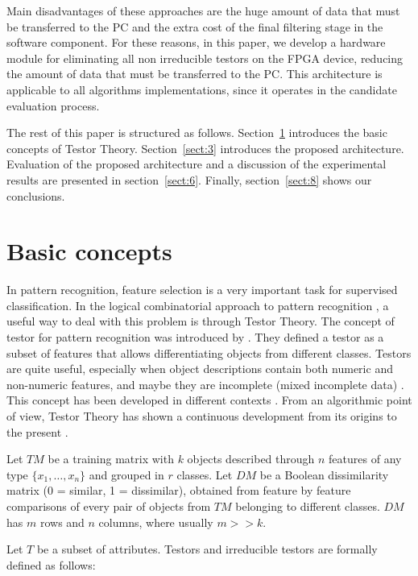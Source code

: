 \documentclass[conference]{IEEEtran}
\begin{document}
Main disadvantages of these approaches are the huge amount of data that must be transferred to the PC and the 
extra cost of the final filtering stage in the software component.  
For these reasons, in this paper, we develop a hardware module for eliminating all non irreducible testors 
on the FPGA device, reducing the amount of data that must be transferred to the PC. This architecture is applicable to all algorithms implementations, since it operates in the candidate evaluation process.

The rest of this paper is structured as follows. Section~\ref{sect:2} introduces the basic concepts of 
Testor Theory. Section~\ref{sect:3} introduces the proposed architecture. Evaluation of the proposed 
architecture and a discussion of the experimental results are presented in section~\ref{sect:6}. Finally,
section~\ref{sect:8} shows our conclusions.

\section{Basic concepts}
\label{sect:2}

In pattern recognition, feature selection is a very important task for supervised classification. In the logical
 combinatorial approach to pattern recognition \cite{Martinez01}, a useful
way to deal with this problem is through Testor Theory. The concept of testor for pattern recognition was
introduced by \cite{Dmitriev66}. They defined a testor as a subset of features that allows
differentiating objects from different classes. Testors are quite useful, especially when object descriptions
contain both numeric and non-numeric features, and maybe they are incomplete (mixed incomplete data)
\cite{Martinez01}. This concept has been developed in different contexts \cite{Lazo01}. From an 
algorithmic point of view, Testor Theory has shown a continuous development from its origins to the present 
\cite{Ruiz85,Sanchez02,Sanchez10}.

Let $TM$ be a training matrix with $k$ objects described through $n$
features of any type $\{x_{1},\ldots,x_{n}\}$ and grouped in $r$
classes. Let $DM$ be a Boolean dissimilarity matrix (0 = similar, 1 =
dissimilar), obtained from feature by feature comparisons of every
pair of objects from $TM$ belonging to different classes. $DM$ has
$m$ rows and $n$ columns, where usually $m>>k$.

Let $T$ be a subset of attributes. Testors and irreducible testors are formally defined as follows:
\end{document}
